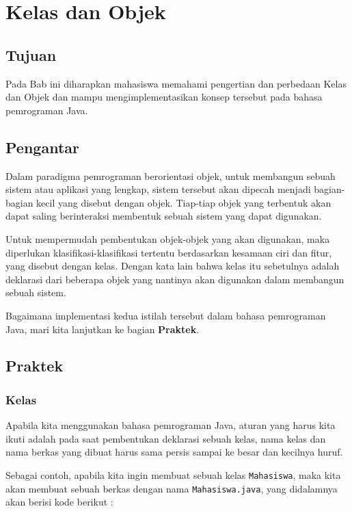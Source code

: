 \chapter{Kelas dan Objek}

\section{Tujuan}

Pada Bab ini diharapkan mahasiswa memahami pengertian dan perbedaan Kelas dan Objek dan mampu mengimplementasikan konsep tersebut pada bahasa pemrograman Java.

\section{Pengantar}

Dalam paradigma pemrograman berorientasi objek, untuk membangun sebuah sistem atau aplikasi yang lengkap, sistem tersebut akan dipecah menjadi bagian-bagian kecil yang disebut dengan objek. Tiap-tiap objek yang terbentuk akan dapat saling berinteraksi membentuk sebuah sistem yang dapat digunakan.

Untuk mempermudah pembentukan objek-objek yang akan digunakan, maka diperlukan klasifikasi-klasifikasi tertentu berdasarkan kesamaan ciri dan fitur, yang disebut dengan kelas. Dengan kata lain bahwa kelas itu sebetulnya adalah deklarasi dari beberapa objek yang nantinya akan digunakan dalam membangun sebuah sistem.

Bagaimana implementasi kedua istilah tersebut dalam bahasa pemrograman Java, mari kita lanjutkan ke bagian \textbf{Praktek}.

\section{Praktek}

\subsection{Kelas}

Apabila kita menggunakan bahasa pemrograman Java, aturan yang harus kita ikuti adalah pada saat pembentukan deklarasi sebuah kelas, nama kelas dan nama berkas yang dibuat harus sama persis sampai ke besar dan kecilnya huruf.

Sebagai contoh, apabila kita ingin membuat sebuah kelas \texttt{Mahasiswa}, maka kita akan membuat sebuah berkas dengan nama \texttt{Mahasiswa.java}, yang didalamnya akan berisi kode berikut :

